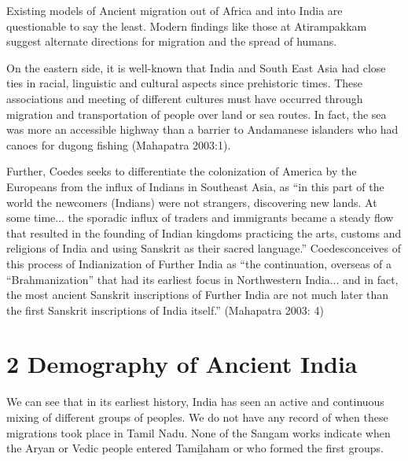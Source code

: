 \vskip 2pt

Existing models of Ancient migration out of Africa and into India are questionable to say the least. Modern findings like those at Atirampakkam suggest alternate directions for migration and the spread of humans.

\vskip 2pt

On the eastern side, it is well-known that India and South East Asia had close ties in racial, linguistic and cultural aspects since prehistoric times. These associations and meeting of different cultures must have occurred through migration and transportation of people over land or sea routes. In fact, the sea was more an accessible highway than a barrier to Andamanese islanders who had canoes for dugong fishing (Mahapatra 2003:1).

\vskip 2pt

\begin{myquote}
Further, Coedes seeks to differentiate the colonization of America by the Europeans from the influx of Indians in Southeast Asia, as “in this part of the world the newcomers (Indians) were not strangers, discovering new lands. At some time... the sporadic influx of traders and immigrants became a steady flow that resulted in the founding of Indian kingdoms practicing the arts, customs and religions of India and using Sanskrit as their sacred language.” Coedesconceives of this process of Indianization of Further India as “the continuation, overseas of a “Brahmanization” that had its earliest focus in Northwestern India... and in fact, the most ancient Sanskrit inscriptions of Further India are not much later than the first Sanskrit inscriptions of India itself.” (Mahapatra 2003: 4)
\end{myquote}


\section*{2 Demography of Ancient India}

We can see that in its earliest history, India has seen an active and continuous mixing of different groups of peoples. We do not have any record of when these migrations took place in Tamil Nadu. None of the Sangam works indicate when the Aryan or Vedic people entered Tamiḻaham or who formed the first groups.

